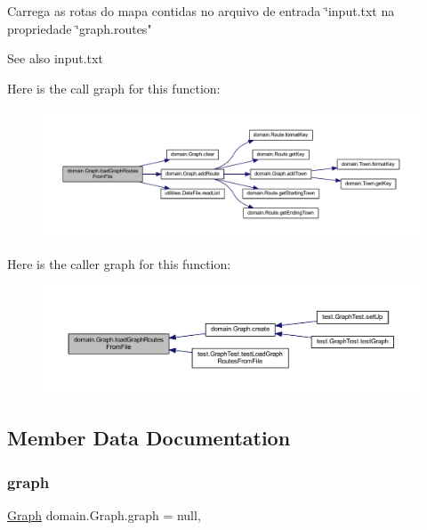 Carrega as rotas do mapa contidas no arquivo de entrada \char`\"{}input.\+txt na propriedade \char`\"{}graph.\+routes"

\begin{DoxySeeAlso}{See also}
input.\+txt 
\end{DoxySeeAlso}
Here is the call graph for this function\+:\nopagebreak
\begin{figure}[H]
\begin{center}
\leavevmode
\includegraphics[width=350pt]{classdomain_1_1_graph_ae98fbece4e39b0fb8979139f06b0a914_cgraph}
\end{center}
\end{figure}
Here is the caller graph for this function\+:\nopagebreak
\begin{figure}[H]
\begin{center}
\leavevmode
\includegraphics[width=350pt]{classdomain_1_1_graph_ae98fbece4e39b0fb8979139f06b0a914_icgraph}
\end{center}
\end{figure}


\subsection{Member Data Documentation}
\mbox{\label{classdomain_1_1_graph_a50ba37beee6b306d2d1044b83d2fff3b}} 
\subsubsection{\texorpdfstring{graph}{graph}}
{\footnotesize\ttfamily \hyperlink{classdomain_1_1_graph}{Graph} domain.\+Graph.\+graph = null\hspace{0.3cm}{\ttfamily [static]}, {\ttfamily [package]}}

